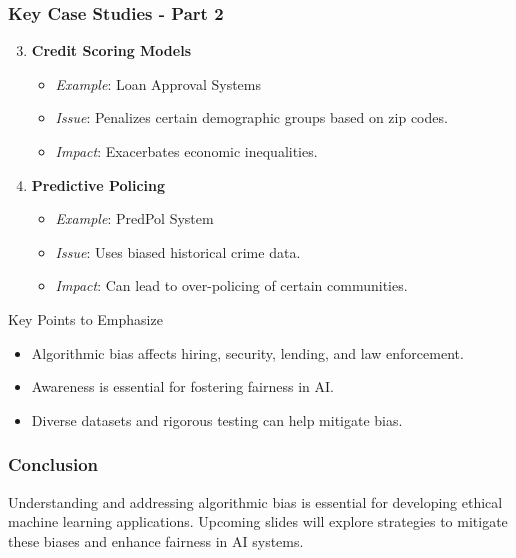 \documentclass[aspectratio=169]{beamer}
\begin{document}
\begin{frame}[fragile]
    \frametitle{Key Case Studies - Part 2}
    \begin{enumerate}
        \setcounter{enumi}{2} %
        \item \textbf{Credit Scoring Models}
            \begin{itemize}
                \item \textit{Example}: Loan Approval Systems
                \item \textit{Issue}: Penalizes certain demographic groups based on zip codes.
                \item \textit{Impact}: Exacerbates economic inequalities.
            \end{itemize}
        
        \item \textbf{Predictive Policing}
            \begin{itemize}
                \item \textit{Example}: PredPol System
                \item \textit{Issue}: Uses biased historical crime data.
                \item \textit{Impact}: Can lead to over-policing of certain communities.
            \end{itemize}
    \end{enumerate}
    
    \begin{block}{Key Points to Emphasize}
        \begin{itemize}
            \item Algorithmic bias affects hiring, security, lending, and law enforcement.
            \item Awareness is essential for fostering fairness in AI.
            \item Diverse datasets and rigorous testing can help mitigate bias.
        \end{itemize}
    \end{block}
\end{frame}

\begin{frame}[fragile]
    \frametitle{Conclusion}
    Understanding and addressing algorithmic bias is essential for developing ethical machine learning applications. Upcoming slides will explore strategies to mitigate these biases and enhance fairness in AI systems.
\end{frame}
\end{document}
